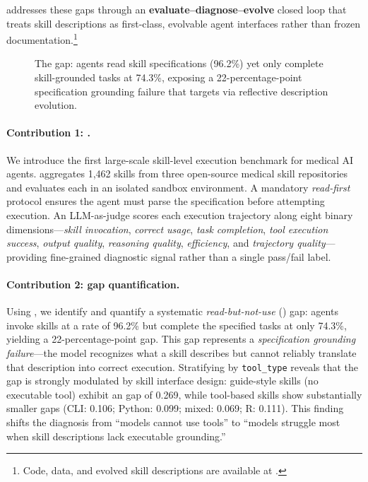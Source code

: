 \medskille addresses these gaps through an \textbf{evaluate--diagnose--evolve} closed loop that treats skill descriptions as first-class, evolvable agent interfaces rather than frozen documentation.\footnote{Code, data, and evolved skill descriptions are available at \anonrepo.}

\begin{figure}[t]
\caption{The \rbu gap: agents read skill specifications (96.2\%) yet only complete skill-grounded tasks at 74.3\%, exposing a 22-percentage-point specification grounding failure that \gepamed targets via reflective description evolution.}
\label{fig:teaser}
\end{figure}

\paragraph{Contribution 1: \medskillbench.}
We introduce the first large-scale skill-level execution benchmark for medical AI agents.
\medskillbench aggregates 1,462 skills from three open-source medical skill repositories and evaluates each in an isolated sandbox environment.
A mandatory \emph{read-first} protocol ensures the agent must parse the \skillmd specification before attempting execution.
An LLM-as-judge scores each execution trajectory along eight binary dimensions---\emph{skill invocation}, \emph{correct usage}, \emph{task completion}, \emph{tool execution success}, \emph{output quality}, \emph{reasoning quality}, \emph{efficiency}, and \emph{trajectory quality}---providing fine-grained diagnostic signal rather than a single pass/fail label.

\paragraph{Contribution 2: \rbu gap quantification.}
Using \medskillbench, we identify and quantify a systematic \emph{read-but-not-use} (\rbu) gap: agents invoke skills at a rate of 96.2\% but complete the specified tasks at only 74.3\%, yielding a 22-percentage-point gap.
This gap represents a \emph{specification grounding failure}---the model recognizes what a skill describes but cannot reliably translate that description into correct execution.
Stratifying by \texttt{tool\_type} reveals that the gap is strongly modulated by skill interface design: guide-style skills (no executable tool) exhibit an \rbu gap of 0.269, while tool-based skills show substantially smaller gaps (CLI: 0.106; Python: 0.099; mixed: 0.069; R: 0.111).
This finding shifts the diagnosis from ``models cannot use tools'' to ``models struggle most when skill descriptions lack executable grounding.''

